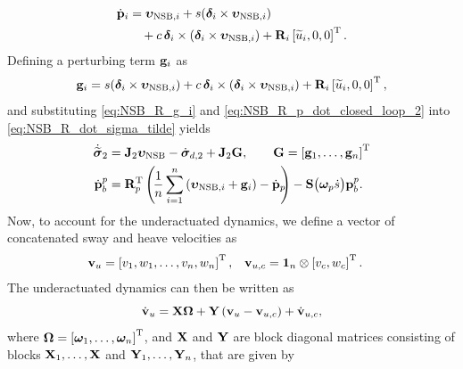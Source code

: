 \begin{equation}
    \begin{split}
    \dot{\mathbf{p}}_i &= \bm{\upsilon}_{{\rm NSB}, i} 
                + s(\bm{\delta}_i \times \bm{\upsilon}_{{\rm NSB}, i}) \\
                & \quad + c\,\bm{\delta}_i\times(\bm{\delta}_i \times \bm{\upsilon}_{{\rm NSB}, i})
                + \mathbf{R}_{i}\left[\widetilde{u}_i, 0, 0\right]^{\mathrm{T}}.
    \end{split} \label{eq:NSB_R_p_dot_closed_loop_2}
\end{equation}
Defining a perturbing term $\mathbf{g}_i$ as 
\begin{equation}
    \mathbf{g}_i = s(\bm{\delta}_i \times \bm{\upsilon}_{{\rm NSB}, i}) 
                + c\,\bm{\delta}_i\times(\bm{\delta}_i \times \bm{\upsilon}_{{\rm NSB}, i}) 
                + \mathbf{R}_{i}\left[\widetilde{u}_i, 0, 0\right]^{\mathrm{T}},
                \label{eq:NSB_R_g_i}
\end{equation}
and substituting \eqref{eq:NSB_R_g_i} and \eqref{eq:NSB_R_p_dot_closed_loop_2} into \eqref{eq:NSB_R_dot_sigma_tilde} yields 
\begin{subequations}
    \begin{align}
        \dot{\widetilde{\bs{\sigma}}}_2 &= \mat{J}_2\bs{\upsilon}_{\rm NSB} - \dot{\bs{\sigma}}_{d, 2}
                                        +\mat{J}_2\mat{G}, \qquad \mat{G} = \inlinevector{\mat{g}_1, \ldots, \mat{g}_n} \\
        \dot{\mat{p}}_b^p &= \mat{R}_p\T\left(\!\frac{1}{n}\sum_{i=1}^n\left(\bs{\upsilon}_{{\rm NSB}, i} + \mat{g}_i\right) - \dot{\mat{p}}_{\mathrlap{p}}\right) - \mat{S}\big(\bs{\omega}_p\dot{s}\big)\mat{p}_b^p \mathrlap{.}
    \end{align} \label{eq:NSB_R_outer_loop}
\end{subequations}
Now, to account for the underactuated dynamics, we define a vector of concatenated sway and heave velocities as 
\begin{align}
    \mathbf{v}_u &= \left[v_1, w_1, \ldots, v_n, w_n\right]^{\mathrm{T}}, &
    \mathbf{v}_{u, c} &= \mathbf{1}_n \otimes \left[v_c, w_c\right]^{\mathrm{T}}.
\end{align}
The underactuated dynamics can then be written as
\begin{equation}
    \dot{\mathbf{v}}_u = \mathbf{X}\bm{\Omega} + \mathbf{Y}\left(\mathbf{v}_u - \mathbf{v}_{u, c}\right) + \dot{\mathbf{v}}_{u, c}, \label{eq:NSB_R_underactuated_dynamics_closed_loop}
\end{equation}
where $\bm{\Omega} = \left[\bm{\omega}_1, \ldots, \bm{\omega}_n\right]^{\mathrm{T}}$, and $\mathbf{X}$ and $\mathbf{Y}$ are block diagonal matrices consisting of blocks $\mathbf{X}_1, \ldots, \mathbf{X}$ and $\mathbf{Y}_1, \ldots, \mathbf{Y}_n$, that are given by 
